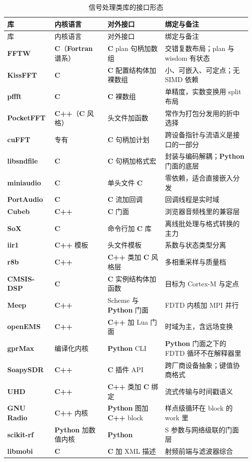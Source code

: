 \documentclass[12pt,a4paper,fontset=fandol]{ctexbook}
\newcommand{\Lib}[1]{\textbf{#1}}
\newcommand{\Lang}[1]{\textsf{\bfseries #1}}
\newcommand{\CL}{\Lang{C}}
\newcommand{\CPP}{\Lang{C++}}
\newcommand{\FTN}{\Lang{Fortran}}
\newcommand{\PY}{\Lang{Python}}
\begin{document}
\begin{longtable}{@{}>{\raggedright\arraybackslash}p{}
  >{\raggedright\arraybackslash}p{}
  >{\raggedright\arraybackslash}p{}
  >{\raggedright\arraybackslash}p{}@{}}
\caption{信号处理类库的接口形态}\label{tab:apA-dsp}\\
\toprule
库 & 内核语言 & 对外接口 & 绑定与备注 \\
\midrule
\endfirsthead
\toprule
库 & 内核语言 & 对外接口 & 绑定与备注 \\
\midrule
\endhead
\Lib{FFTW} & \CL{}（\FTN{} 谱系） & \CL{} plan 句柄加数组 &
  交错复数布局；plan 与 wisdom 有状态 \\
\Lib{KissFFT} & \CL{} & \CL{} 配置结构体加裸数组 &
  小、可嵌入、可定点；无 SIMD 依赖 \\
\Lib{pffft} & \CL{} & \CL{} 裸数组 &
  单精度，实数变换用 split 布局 \\
\Lib{PocketFFT} & \CPP{}（\CL{} 风格） & 头文件加函数 &
  常作为打包分发用的折中选择 \\
\Lib{cuFFT} & 专有 & \CL{} 句柄加计划 &
  跨设备指针与流语义是接口的一部分 \\
\Lib{libsndfile} & \CL{} & \CL{} 句柄加格式宏 &
  封装与编码解耦；\PY{} 门面的底层 \\
\Lib{miniaudio} & \CL{} & 单头文件 \CL{} &
  零依赖，适合直接嵌入分发 \\
\Lib{PortAudio} & \CL{} & \CL{} 流加回调 &
  回调线程是实时域 \\
\Lib{Cubeb} & \CPP{} & \CL{} 门面 &
  浏览器音频栈里的兼容层 \\
\Lib{SoX} & \CL{} & 命令行加 \CL{} 库 &
  离线批处理与格式转换的主力 \\
\Lib{iir1} & \CPP{} 模板 & 头文件模板 &
  系数与状态类型分离 \\
\Lib{r8b} & \CPP{} & \CPP{} 类加 \CL{} 风格层 &
  多相重采样与质量档 \\
\Lib{CMSIS-DSP} & \CL{} & \CL{} 实例结构体加函数 &
  目标为 Cortex-M 与定点 \\
\Lib{Meep} & \CPP{} & Scheme 与 \PY{} 门面 &
  FDTD 内核加 MPI 并行 \\
\Lib{openEMS} & \CPP{} & \CPP{} 加 Lua 门面 &
  时域为主，含远场变换 \\
\Lib{gprMax} & 编译化内核 & \PY{} CLI &
  \PY{} 门面之下的 FDTD 循环不在解释器里 \\
\Lib{SoapySDR} & \CPP{} & \CL{} 插件 API &
  跨厂商设备抽象；键值协商格式 \\
\Lib{UHD} & \CPP{} & \CPP{} 类加 \CL{} 绑定 &
  流式传输与时间戳语义 \\
\Lib{GNU Radio} & \CPP{} 内核 & \PY{} 图加 \CPP{} block &
  样点级循环在 block 的 work 里 \\
\Lib{scikit-rf} & \PY{} 加数值内核 & \PY{} &
  S 参数与网络级联的门面层 \\
\Lib{libmobi} & \CL{} & \CL{} 加 XML 描述 &
  射频前端与滤波器综合 \\
\end{longtable}
\end{document}
